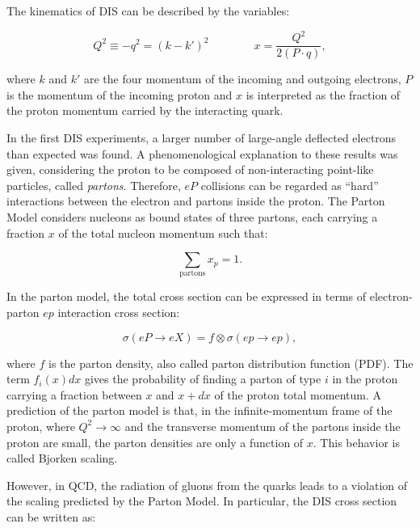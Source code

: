 The kinematics of DIS can be described by the variables:

\begin{equation}
Q^2 \equiv -q^2 = (k-k')^2 \qquad\qquad x = \frac{Q^2}{2(P \cdot q)},
\label{eq:DISvariables}
\end{equation}

\noindent where $k$ and $k'$ are the four momentum of the incoming and outgoing electrons, $P$ is the momentum of the incoming proton and $x$ is interpreted as the fraction of the proton momentum carried by the interacting quark.

In the first DIS experiments, a larger number of large-angle deflected electrons than expected was found.
A phenomenological explanation to these results was given, considering the proton to be composed of non-interacting point-like particles, called \emph{partons}.
Therefore, $eP$ collisions can be regarded as ``hard'' interactions between the electron and partons inside the proton.
The Parton Model considers nucleons as bound states of three partons, each carrying a fraction $x$ of the total nucleon momentum such that:

\begin{equation}
\sum_{\text{partons}}{x_p} = 1.
\label{eq:sumFractionProton}
\end{equation}

In the parton model, the total cross section can be expressed in terms of electron-parton $ep$ interaction cross section:

\begin{equation}
\sigma(eP\rightarrow eX) = f \otimes \sigma(ep\rightarrow ep),
\label{eq:FactorizationTheoremSketch}
\end{equation}

\noindent where $f$ is the parton density, also called parton distribution function (PDF).
The term $f_i(x)dx$ gives the probability of finding a parton of type $i$ in the proton carrying a fraction between $x$ and $x+dx$ of the proton total momentum.
A prediction of the parton model is that, in the infinite-momentum frame of the proton, where $Q^2 \rightarrow \infty$ and the transverse momentum of the partons inside the proton are small, the parton densities are only a function of $x$.
This behavior is called Bjorken scaling.

However, in QCD, the radiation of gluons from the quarks leads to a violation of the scaling predicted by the Parton Model.
In particular, the DIS cross section can be written as:

